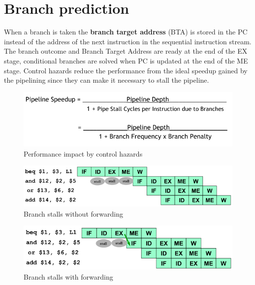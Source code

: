 
\section{Branch prediction}\label{sec:branch-prediction}
When a branch is taken the \textbf{branch target address} (BTA) is stored in the PC instead of the address of the
next instruction in the sequential instruction stream.
The branch outcome and Branch Target Address are ready at the end of the EX stage, conditional branches are solved
when PC is updated at the end of the ME stage.
Control hazards reduce the performance from the ideal speedup gained by the pipelining since they can
make it necessary to stall the pipeline.

\begin{figure}[h]
    \centering
    \includegraphics[scale = 0.35]{images/performace-impact-control-hazards}
    \caption{Performance impact by control hazards}
    \label{fig:performance-impact-by-control-hazards}
\end{figure}


\begin{figure}[h]
    \centering
    \includegraphics[scale = 0.4]{images/branch-without-forwarding}
    \caption{Branch stalls without forwarding}
    \label{fig:branch-stalls-without-forwarding}
\end{figure}

\begin{figure}[h]
    \centering
    \includegraphics[scale = 0.4]{images/branch-with-forwarding}
    \caption{Branch stalls with forwarding}
    \label{fig:branch-stalls-with-forwarding}
\end{figure}

